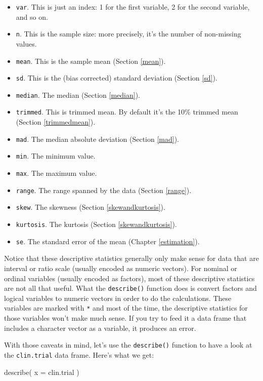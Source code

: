 \documentclass[
]{book}
\newenvironment{Shaded}{\begin{snugshade}}{\end{snugshade}}
\newcommand{\AttributeTok}[1]{\textcolor[rgb]{0.77,0.63,0.00}{#1}}
\newcommand{\FunctionTok}[1]{\textcolor[rgb]{0.00,0.00,0.00}{#1}}
\newcommand{\NormalTok}[1]{#1}
\providecommand{\tightlist}{%
  \setlength{\itemsep}{0pt}\setlength{\parskip}{0pt}}
\begin{document}
\begin{itemize}
\tightlist
\item
  \texttt{var}. This is just an index: 1 for the first variable, 2 for the second variable, and so on.
\item
  \texttt{n}. This is the sample size: more precisely, it's the number of non-missing values.
\item
  \texttt{mean}. This is the sample mean (Section \ref{mean}).
\item
  \texttt{sd}. This is the (bias corrected) standard deviation (Section \ref{sd}).
\item
  \texttt{median}. The median (Section \ref{median}).
\item
  \texttt{trimmed}. This is trimmed mean. By default it's the 10\% trimmed mean (Section \ref{trimmedmean}).
\item
  \texttt{mad}. The median absolute deviation (Section \ref{mad}).
\item
  \texttt{min}. The minimum value.
\item
  \texttt{max}. The maximum value.
\item
  \texttt{range}. The range spanned by the data (Section \ref{range}).
\item
  \texttt{skew}. The skewness (Section \ref{skewandkurtosis}).
\item
  \texttt{kurtosis}. The kurtosis (Section \ref{skewandkurtosis}).
\item
  \texttt{se}. The standard error of the mean (Chapter \ref{estimation}).
\end{itemize}

Notice that these descriptive statistics generally only make sense for data that are interval or ratio scale (usually encoded as numeric vectors). For nominal or ordinal variables (usually encoded as factors), most of these descriptive statistics are not all that useful. What the \texttt{describe()} function does is convert factors and logical variables to numeric vectors in order to do the calculations. These variables are marked with \texttt{*} and most of the time, the descriptive statistics for those variables won't make much sense. If you try to feed it a data frame that includes a character vector as a variable, it produces an error.

With those caveats in mind, let's use the \texttt{describe()} function to have a look at the \texttt{clin.trial} data frame. Here's what we get:

\begin{Shaded}
\begin{Highlighting}[]
\FunctionTok{describe}\NormalTok{( }\AttributeTok{x =}\NormalTok{ clin.trial )}
\end{Highlighting}
\end{Shaded}
\end{document}
